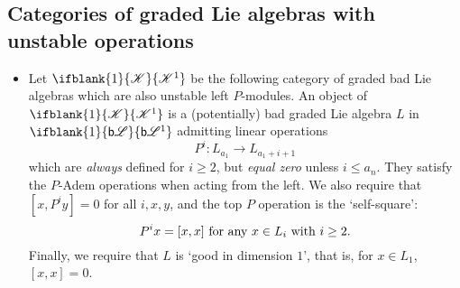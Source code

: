 \documentclass[10pt]{article}
\newcommand{\BadLie}[1]%
{\ifblank{#1}{\mathsf{b}{\scrL}}{\mathsf{b}{\scrL}^{#1}}}
\newcommand{\LL}[1]{\ifblank{#1}{\scrK}{\scrK^{#1}}}
\renewcommand{\Q}{Q}
\newcommand{\Comm}{\calC}
\newcommand{\CommSteen}{\calA(\Comm)}
\begin{document}
\begin{CategoriesOfInterest}
\subsection{Categories of graded Lie algebras with unstable operations}
\begin{itemize}
\setlength{\parindent}{.25in}
\item Let $\LL{1}$ be the following category of graded bad Lie algebras which are also unstable left $P$-modules.
An object of $\LL{1}$ is a (potentially) bad graded Lie algebra $L$ in $\BadLie{1}$ %
admitting linear operations
\[P^i:L_{a_1}\to L_{a_1+i+1}\]
which are \emph{always} defined for $i\geq2$, but \emph{equal zero} unless $i\leq a_n$. They satisfy the $P$-Adem operations when acting from the left. We also require that $[x,P^iy]=0$ for all $i,x,y$, and the top $P$ operation is the `self-square':
\[P^{i}x=[x,x]\ \textup{for any $x\in L_{i}$ with $i\geq2$}.\]
Finally, we require that $L$ is `good in dimension $1$', that is, for $x\in L_1$, $[x,x]=0$.


\end{itemize}
\end{CategoriesOfInterest}
\end{document}
